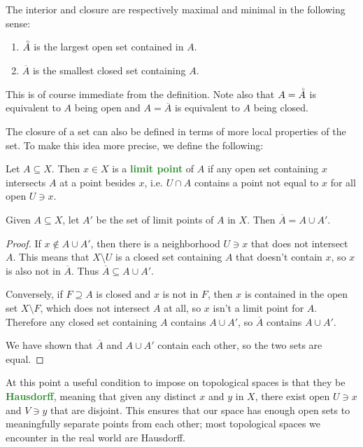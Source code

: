 \documentclass[11pt]{scrartcl}
\providecommand{\ol}{\overline}
\providecommand{\interior}[1]{\accentset{\circ}{#1}}
\providecommand{\ii}{\item}
\providecommand{\vocab}[1]{{\textbf{\textcolor{ForestGreen}{#1}}}}
\begin{document}
\begin{prop}
    \label{prop:interior-closure-extremal}
    The interior and closure are respectively maximal and minimal
    in the following sense:
    \begin{enumerate}[(1)]
        \ii $\interior A$ is the largest open set contained in $A$.
	\ii $\ol A$ is the smallest closed set containing $A$.
    \end{enumerate}
\end{prop}

This is of course immediate from the definition.
Note also that $A = \interior A$ is equivalent to $A$ being open
and $A = \ol A$ is equivalent to $A$ being closed.

The closure of a set can also be defined in terms of
more local properties of the set.
To make this idea more precise, we define the following:
\begin{definition}
    \label{def:limit-point}
    Let $A\subseteq X$. Then $x\in X$ is a \vocab{limit point} of $A$
    if any open set containing $x$ intersects $A$ at a point besides $x$,
    i.e. $U\cap A$ contains a point not equal to $x$
    for all open $U\ni x$.
\end{definition}

\begin{theorem}
    \label{thm:closure-by-limit-pts}
    Given $A\subseteq X$, let $A'$ be the set of limit points of $A$ in $X$.
    Then $\ol A = A\cup A'$.
\end{theorem}

\begin{proof}
    If $x\notin A\cup A'$, then there is a neighborhood $U\ni x$
    that does not intersect $A$. This means that $X\setminus U$
    is a closed set containing $A$ that doesn't contain $x$,
    so $x$ is also not in $\ol A$. Thus $\ol A\subseteq A\cup A'$.

    Conversely, if $F\supseteq A$ is closed and $x$ is not in $F$,
    then $x$ is contained in the open set $X\setminus F$,
    which does not intersect $A$ at all, so $x$ isn't a limit point for $A$.
    Therefore any closed set containing $A$ contains $A\cup A'$,
    so $\ol A$ contains $A\cup A'$.

    We have shown that $\ol A$ and $A\cup A'$ contain each other,
    so the two sets are equal.
\end{proof}

At this point a useful condition to impose on topological spaces is
that they be \vocab{Hausdorff}, meaning that
given any distinct $x$ and $y$ in $X$,
there exist open $U\ni x$ and $V\ni y$ that are disjoint.
This ensures that our space has enough open sets
to meaningfully separate points from each other;
most topological spaces we encounter in the real world are Hausdorff.
\end{document}
